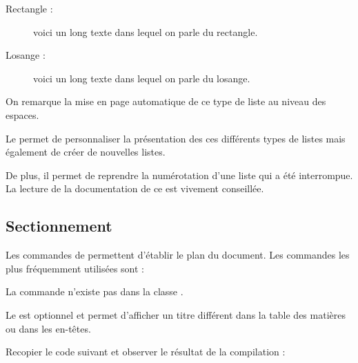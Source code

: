 \documentclass[10pt,french]{book}
\begin{document}
{\NewFont\reset
\begin{SideBySideExample}
    \begin{description}
        \item[Rectangle :] voici un long texte dans
            lequel on parle du rectangle.
        \item[Losange :] voici un long texte dans lequel
            on parle du losange.
    \end{description}
    On remarque la mise en page automatique
    de ce type de liste au niveau des espaces.
\end{SideBySideExample}
\bigskip}

\begin{info}
    Le \package {} permet de personnaliser la présentation des ces différents types de listes mais également de créer de nouvelles listes.\par
    De plus, il permet de reprendre la numérotation d'une liste  qui a été interrompue. La lecture de la documentation de ce \package est vivement conseillée.
\end{info}
\subsection{Sectionnement}

Les commandes de  permettent d'établir le plan du document. Les commandes les plus fréquemment utilisées sont :\medskip

\begin{obeylines}
\end{obeylines}

\begin{info}
    La commande  n'existe pas dans la classe .\par
    Le  est optionnel et permet d'afficher un titre différent dans la table des matières ou dans les en-têtes.
\end{info}

Recopier le code suivant et observer le résultat de la compilation :

\end{document}
